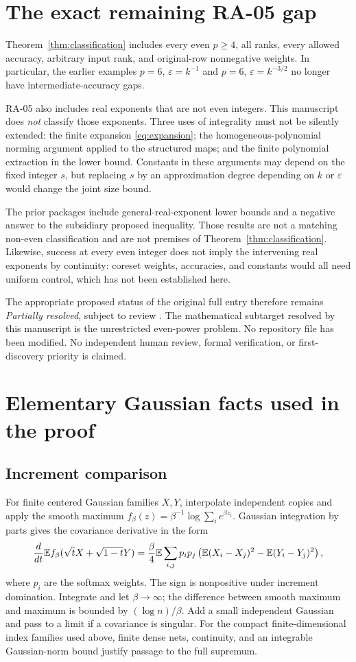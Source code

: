 \documentclass[11pt]{article}
\theoremstyle{remark}\newtheorem{remark}[theorem]{Remark}
\newcommand{\eps}{\varepsilon}\newcommand{\Sym}{\operatorname{Sym}}
\begin{document}
\section{The exact remaining RA-05 gap}\label{sec:gap}
Theorem~\ref{thm:classification} includes every even $p\ge4$, all ranks, every allowed accuracy, arbitrary input rank, and original-row nonnegative weights. In particular, the earlier examples $p=6$, $\eps=k^{-1}$ and $p=6$, $\eps=k^{-3/2}$ no longer have intermediate-accuracy gaps.

RA-05 also includes real exponents that are not even integers. This manuscript does \emph{not} classify those exponents. Three uses of integrality must not be silently extended: the finite expansion \eqref{eq:expansion}; the homogeneous-polynomial norming argument applied to the structured maps; and the finite polynomial extraction in the lower bound. Constants in these arguments may depend on the fixed integer $s$, but replacing $s$ by an approximation degree depending on $k$ or $\eps$ would change the joint size bound.

The prior packages include general-real-exponent lower bounds and a negative answer to the subsidiary proposed inequality. Those results are not a matching non-even classification and are not premises of Theorem~\ref{thm:classification}. Likewise, success at every even integer does not imply the intervening real exponents by continuity: coreset weights, accuracies, and constants would all need uniform control, which has not been established here.

The appropriate proposed status of the original full entry therefore remains \emph{Partially resolved}, subject to review \cite{status}. The mathematical subtarget resolved by this manuscript is the unrestricted even-power problem. No repository file has been modified. No independent human review, formal verification, or first-discovery priority is claimed.

\appendix
\section{Elementary Gaussian facts used in the proof}\label{app:gaussian}
\subsection{Increment comparison}
For finite centered Gaussian families $X,Y$, interpolate independent copies and apply the smooth maximum $f_\beta(z)=\beta^{-1}\log\sum_i e^{\beta z_i}$. Gaussian integration by parts gives the covariance derivative in the form
\[
 \frac{d}{dt}\mathbb E f_\beta(\sqrt t X+\sqrt{1-t}Y)
 =\frac\beta4\mathbb E\sum_{i,j}p_ip_j
 \left(\mathbb E(X_i-X_j)^2-\mathbb E(Y_i-Y_j)^2\right),
\]
where $p_i$ are the softmax weights. The sign is nonpositive under increment domination. Integrate and let $\beta\to\infty$; the difference between smooth maximum and maximum is bounded by $(\log n)/\beta$. Add a small independent Gaussian and pass to a limit if a covariance is singular. For the compact finite-dimensional index families used above, finite dense nets, continuity, and an integrable Gaussian-norm bound justify passage to the full supremum.
\end{document}
